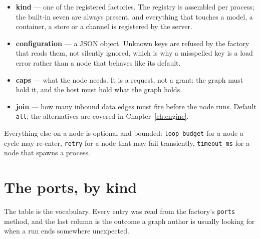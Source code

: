 \begin{itemize}
	\item \textbf{kind} --- one of the registered factories. The registry is assembled per process;
	the built-in seven are always present, and everything that touches a model, a container, a store
	or a channel is registered by the server.
	\item \textbf{configuration} --- a JSON object. Unknown keys are refused by the factory that reads
	them, not silently ignored, which is why a misspelled key is a load error rather than a node that
	behaves like its default.
	\item \textbf{caps} --- what the node needs. It is a request, not a grant: the graph must hold
	it, and the host must hold what the graph holds.
	\item \textbf{join} --- how many inbound data edges must fire before the node runs. Default
	\texttt{all}; the alternatives are covered in Chapter~\ref{ch:engine}.
\end{itemize}

Everything else on a node is optional and bounded: \texttt{loop\_budget} for a node a cycle may
re-enter, \texttt{retry} for a node that may fail transiently, \texttt{timeout\_ms} for a node that
spawns a process.

\section{The ports, by kind}

The table is the vocabulary. Every entry was read from the factory's \texttt{ports} method, and the
last column is the outcome a graph author is usually looking for when a run ends somewhere
unexpected.

